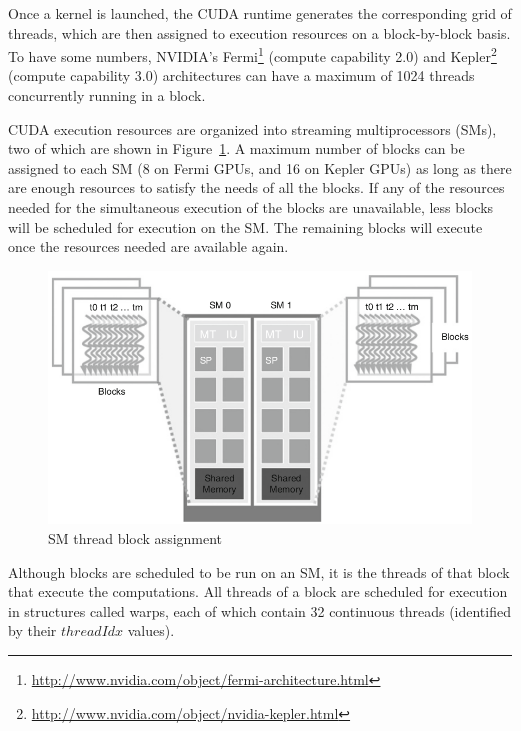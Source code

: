 \documentclass[12pt, a4paper]{report}
\begin{document}
\begin{sloppypar}
Once a kernel is launched, the CUDA runtime generates the corresponding grid of
threads, which are then assigned to execution resources on a block-by-block
basis.
To have some numbers, NVIDIA's Fermi\footnote{\url{http://www.nvidia.com/object/fermi-architecture.html}} (compute capability 2.0) and Kepler\footnote{\url{http://www.nvidia.com/object/nvidia-kepler.html}}
(compute capability 3.0) architectures can have a maximum of 1024 threads
concurrently running in a block.

CUDA execution resources are organized into streaming multiprocessors (SMs), two
of which are shown in Figure~\ref{fig:sm_thread_block_assignment}.
A maximum number of blocks can be assigned to each SM (8 on Fermi GPUs, and 16
on Kepler GPUs) as long as there are enough resources to satisfy the needs of
all the blocks.
If any of the resources needed for the simultaneous execution of the blocks are
unavailable, less blocks will be scheduled for execution on the SM.
The remaining blocks will execute once the resources needed are available again.

\begin{figure}[h]
\centering
\includegraphics[scale=0.4]{figs/sm_thread_block_assignment}
\caption{SM thread block assignment}
\label{fig:sm_thread_block_assignment}
\end{figure}

Although blocks are scheduled to be run on an SM, it is the threads of that
block that execute the computations.
All threads of a block are scheduled for execution in structures called warps,
each of which contain 32 continuous threads (identified by their $threadIdx$
values).


\end{sloppypar}
\end{document}
